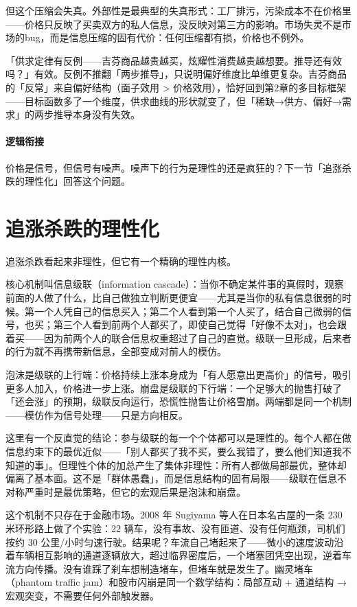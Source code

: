 \documentclass[../../main2.tex]{subfiles}
\begin{document}
	但这个压缩会失真。外部性是最典型的失真形式：工厂排污，污染成本不在价格里——价格只反映了买卖双方的私人信息，没反映对第三方的影响。市场失灵不是市场的bug，而是信息压缩的固有代价：任何压缩都有损，价格也不例外。

	\begin{questionbox}
		「供求定律有反例——吉芬商品越贵越买，炫耀性消费越贵越想要。推导还有效吗？」有效。反例不推翻「两步推导」，只说明偏好维度比单维更复杂。吉芬商品的「反常」来自偏好结构（面子效用 > 价格效用），恰好回到第2章的多目标框架——目标函数多了一个维度，供求曲线的形状就变了，但「稀缺→供方、偏好→需求」的两步推导本身没有失效。
	\end{questionbox}

	\paragraph*{逻辑衔接}
	价格是信号，但信号有噪声。噪声下的行为是理性的还是疯狂的？下一节「追涨杀跌的理性化」回答这个问题。

	\section{追涨杀跌的理性化}
	\label{sec:econ-herding}

	追涨杀跌看起来非理性，但它有一个精确的理性内核。

	核心机制叫信息级联（information cascade）：当你不确定某件事的真假时，观察前面的人做了什么，比自己做独立判断更便宜——尤其是当你的私有信息很弱的时候。第一个人凭自己的信息买入；第二个人看到第一个人买了，结合自己微弱的信号，也买；第三个人看到前两个人都买了，即使自己觉得「好像不太对」，也会跟着买——因为前两个人的联合信息权重超过了自己的直觉。级联一旦形成，后来者的行为就不再携带新信息，全部变成对前人的模仿。

	泡沫是级联的上行端：价格持续上涨本身成为「有人愿意出更高价」的信号，吸引更多人加入，价格进一步上涨。崩盘是级联的下行端：一个足够大的抛售打破了「还会涨」的预期，级联反向运行，恐慌性抛售让价格雪崩。两端都是同一个机制——模仿作为信号处理——只是方向相反。

	这里有一个反直觉的结论：参与级联的每一个个体都可以是理性的。每个人都在做信息约束下的最优近似——「别人都买了我不买，要么我错了，要么他们知道我不知道的事」。但理性个体的加总产生了集体非理性：所有人都做局部最优，整体却偏离了基本面。这不是「群体愚蠢」，而是信息结构的固有局限——级联在信息不对称严重时是最优策略，但它的宏观后果是泡沫和崩盘。

	这个机制不只存在于金融市场。2008 年 Sugiyama 等人在日本名古屋的一条 230 米环形路上做了个实验：22 辆车，没有事故、没有匝道、没有任何瓶颈，司机们按约 30 公里/小时匀速行驶。结果呢？车流自己堵起来了——微小的速度波动沿着车辆相互影响的通道逐辆放大，超过临界密度后，一个堵塞团凭空出现，逆着车流方向传播。没有谁踩了刹车想制造堵车，但堵车就是发生了。幽灵堵车（phantom traffic jam）和股市闪崩是同一个数学结构：局部互动 + 通道结构 → 宏观突变，不需要任何外部触发器。
\end{document}
